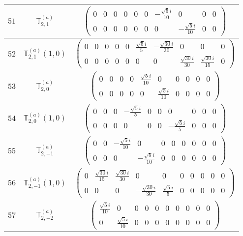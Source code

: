 \documentclass[fleqn,8pt,landscape]{jsarticle}
\begin{document}
\begin{center}
\begin{longtable}{ccc}
$ 51 $ & $ \mathbb{T}_{2,1}^{(a)} $ & $ \begin{pmatrix} 0 & 0 & 0 & 0 & 0 & 0 & - \frac{\sqrt{5} i}{10} & 0 & 0 & 0 \\ 0 & 0 & 0 & 0 & 0 & 0 & 0 & - \frac{\sqrt{5} i}{10} & 0 & 0 \end{pmatrix} $ \\ \hline
$ 52 $ & $ \mathbb{T}_{2,1}^{(a)}(1,0) $ & $ \begin{pmatrix} 0 & 0 & 0 & 0 & 0 & \frac{\sqrt{5} i}{5} & - \frac{\sqrt{30} i}{30} & 0 & 0 & 0 \\ 0 & 0 & 0 & 0 & 0 & 0 & 0 & \frac{\sqrt{30} i}{30} & \frac{\sqrt{30} i}{15} & 0 \end{pmatrix} $ \\ \hline
$ 53 $ & $ \mathbb{T}_{2,0}^{(a)} $ & $ \begin{pmatrix} 0 & 0 & 0 & 0 & \frac{\sqrt{5} i}{10} & 0 & 0 & 0 & 0 & 0 \\ 0 & 0 & 0 & 0 & 0 & \frac{\sqrt{5} i}{10} & 0 & 0 & 0 & 0 \end{pmatrix} $ \\ \hline
$ 54 $ & $ \mathbb{T}_{2,0}^{(a)}(1,0) $ & $ \begin{pmatrix} 0 & 0 & 0 & - \frac{\sqrt{5} i}{5} & 0 & 0 & 0 & 0 & 0 & 0 \\ 0 & 0 & 0 & 0 & 0 & 0 & - \frac{\sqrt{5} i}{5} & 0 & 0 & 0 \end{pmatrix} $ \\ \hline
$ 55 $ & $ \mathbb{T}_{2,-1}^{(a)} $ & $ \begin{pmatrix} 0 & 0 & - \frac{\sqrt{5} i}{10} & 0 & 0 & 0 & 0 & 0 & 0 & 0 \\ 0 & 0 & 0 & - \frac{\sqrt{5} i}{10} & 0 & 0 & 0 & 0 & 0 & 0 \end{pmatrix} $ \\ \hline
$ 56 $ & $ \mathbb{T}_{2,-1}^{(a)}(1,0) $ & $ \begin{pmatrix} 0 & \frac{\sqrt{30} i}{15} & \frac{\sqrt{30} i}{30} & 0 & 0 & 0 & 0 & 0 & 0 & 0 \\ 0 & 0 & 0 & - \frac{\sqrt{30} i}{30} & \frac{\sqrt{5} i}{5} & 0 & 0 & 0 & 0 & 0 \end{pmatrix} $ \\ \hline
$ 57 $ & $ \mathbb{T}_{2,-2}^{(a)} $ & $ \begin{pmatrix} \frac{\sqrt{5} i}{10} & 0 & 0 & 0 & 0 & 0 & 0 & 0 & 0 & 0 \\ 0 & \frac{\sqrt{5} i}{10} & 0 & 0 & 0 & 0 & 0 & 0 & 0 & 0 \end{pmatrix} $ \\ \hline

\end{longtable}
\end{center}
\end{document}
